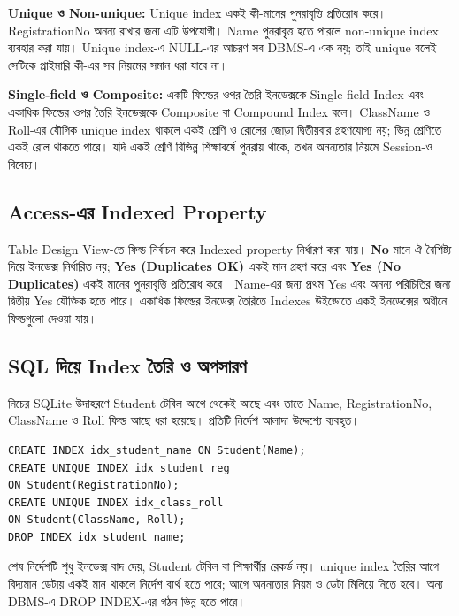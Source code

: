 \textbf{Unique ও Non-unique:} Unique index একই কী-মানের পুনরাবৃত্তি প্রতিরোধ করে। RegistrationNo অনন্য রাখার জন্য এটি উপযোগী। Name পুনরাবৃত্ত হতে পারলে non-unique index ব্যবহার করা যায়। Unique index-এ NULL-এর আচরণ সব DBMS-এ এক নয়; তাই unique বলেই সেটিকে প্রাইমারি কী-এর সব নিয়মের সমান ধরা যাবে না।

\textbf{Single-field ও Composite:} একটি ফিল্ডের ওপর তৈরি ইনডেক্সকে Single-field Index এবং একাধিক ফিল্ডের ওপর তৈরি ইনডেক্সকে Composite বা Compound Index বলে। ClassName ও Roll-এর যৌগিক unique index থাকলে একই শ্রেণি ও রোলের জোড়া দ্বিতীয়বার গ্রহণযোগ্য নয়; ভিন্ন শ্রেণিতে একই রোল থাকতে পারে। যদি একই শ্রেণি বিভিন্ন শিক্ষাবর্ষে পুনরায় থাকে, তখন অনন্যতার নিয়মে Session-ও বিবেচ্য।

\subsection{Access-এর Indexed Property}
Table Design View-তে ফিল্ড নির্বাচন করে Indexed property নির্ধারণ করা যায়। \textbf{No} মানে ঐ বৈশিষ্ট্য দিয়ে ইনডেক্স নির্ধারিত নয়; \textbf{Yes (Duplicates OK)} একই মান গ্রহণ করে এবং \textbf{Yes (No Duplicates)} একই মানের পুনরাবৃত্তি প্রতিরোধ করে। Name-এর জন্য প্রথম Yes এবং অনন্য পরিচিতির জন্য দ্বিতীয় Yes যৌক্তিক হতে পারে। একাধিক ফিল্ডের ইনডেক্স তৈরিতে Indexes উইন্ডোতে একই ইনডেক্সের অধীনে ফিল্ডগুলো দেওয়া যায়।


\subsection{SQL দিয়ে Index তৈরি ও অপসারণ}
নিচের SQLite উদাহরণে Student টেবিল আগে থেকেই আছে এবং তাতে Name, RegistrationNo, ClassName ও Roll ফিল্ড আছে ধরা হয়েছে। প্রতিটি নির্দেশ আলাদা উদ্দেশ্যে ব্যবহৃত।
\begin{verbatim}
CREATE INDEX idx_student_name ON Student(Name);
CREATE UNIQUE INDEX idx_student_reg
ON Student(RegistrationNo);
CREATE UNIQUE INDEX idx_class_roll
ON Student(ClassName, Roll);
DROP INDEX idx_student_name;
\end{verbatim}
শেষ নির্দেশটি শুধু ইনডেক্স বাদ দেয়, Student টেবিল বা শিক্ষার্থীর রেকর্ড নয়। unique index তৈরির আগে বিদ্যমান ডেটায় একই মান থাকলে নির্দেশ ব্যর্থ হতে পারে; আগে অনন্যতার নিয়ম ও ডেটা মিলিয়ে নিতে হবে। অন্য DBMS-এ DROP INDEX-এর গঠন ভিন্ন হতে পারে।

